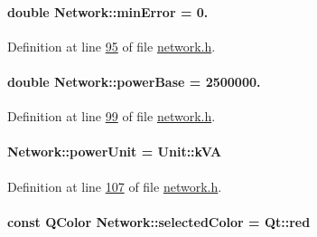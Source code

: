 \paragraph[{min\+Error}]{\setlength{\rightskip}{0pt plus 5cm}double Network\+::min\+Error = 0.\hspace{0.3cm}{\ttfamily [static]}}\label{group___graphics_gabcdc973129d3dda7572b7a1c388da1b5}


Definition at line \hyperlink{network_8h_source_l00095}{95} of file \hyperlink{network_8h_source}{network.\+h}.

\hypertarget{group___graphics_ga74bb7aa495d422f1f092acdf958df989}{}
\paragraph[{power\+Base}]{\setlength{\rightskip}{0pt plus 5cm}double Network\+::power\+Base = 2500000.\hspace{0.3cm}{\ttfamily [static]}}\label{group___graphics_ga74bb7aa495d422f1f092acdf958df989}


Definition at line \hyperlink{network_8h_source_l00099}{99} of file \hyperlink{network_8h_source}{network.\+h}.

\hypertarget{group___graphics_ga9504015bc566f4a3d3b4d4a86000293b}{}
\paragraph[{power\+Unit}]{ Network\+::power\+Unit = {\bf Unit\+::k\+V\+A}\hspace{0.3cm}{\ttfamily [static]}}\label{group___graphics_ga9504015bc566f4a3d3b4d4a86000293b}


Definition at line \hyperlink{network_8h_source_l00107}{107} of file \hyperlink{network_8h_source}{network.\+h}.

\hypertarget{group___graphics_gaa9e21b8e2a24b0495e776a51e1aeed94}{}
\paragraph[{selected\+Color}]{\setlength{\rightskip}{0pt plus 5cm}const Q\+Color Network\+::selected\+Color = Qt\+::red\hspace{0.3cm}{\ttfamily [static]}}\label{group___graphics_gaa9e21b8e2a24b0495e776a51e1aeed94}



